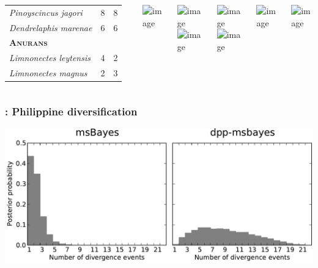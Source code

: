 \begin{frame}
\begin{columns}[c]
\begin{table}
\begin{tabular}{ l c c }
                \emph{Pinoyscincus jagori}          & 8  & 8  \\
                \emph{Dendrelaphis marenae}         & 6  & 6  \\
                \textbf{\textsc{Anurans}}  & & \\
                \emph{Limnonectes leytensis}        & 4  & 2  \\
                \emph{Limnonectes magnus}           & 2  & 3  \\
                \hline
            \end{tabular}
        \end{table}
        \centerline{
        \includegraphics<1>[height=1.5cm]{../images/photos/crocidura-negrina-JAEsselstyn.jpg}}
        \centerline{
        \includegraphics<1>[height=1.5cm]{../images/photos/hipposideros-obscurus-MRMDuya.jpg}
        \hspace{0.3mm}
        \includegraphics<1>[height=1.5cm]{../images/photos/haplonycteris-fischeri-JHolden.jpg}}
        \centerline{
        \includegraphics<1>[height=1.5cm]{../images/photos/gekko-mindorensis.jpg}
        \hspace{0.3mm}
        \includegraphics<1>[height=1.5cm]{../images/photos/sphenomorphus-arborens-rmb.jpg}}
        \centerline{
        \includegraphics<1>[height=1.5cm]{../images/photos/dendrelaphis-pictus-cds.jpg}}
        \centerline{
        \includegraphics<1>[height=1.5cm]{../images/photos/limnonectes-leytensis-rmb.jpg}}
\end{columns}
\end{frame}

\begin{frame}
    \frametitle{\dppmsbayes: Philippine diversification}
    \includegraphics[width=\textwidth]{../../empirical-analyses/plots/philippines-dpp-psi-posterior-old-vs-dpp.pdf}
\end{frame}

